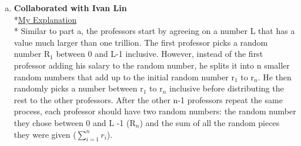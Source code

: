 \documentclass[12pt]{article}
\begin{document}
\begin{enumerate}[(a)]
\\*The second professor adds his salary to the number, mods it by L, then gives it to then next professor until all n professors have added their salary and modded the result. After the first professor receives the number from the nth professor, he subtracts his random number then mods the result by L to get the total salary of all the professors. Dividing by the amount of professors in the room n results in the average salary of all the professors in the room without any information leakage.
\vspace{0.5cm}
\\*\centerline{Total Salary $<$ 1 Trillion\hspace{0.75in} 1 Trillion $<$ L\hspace{0.75in} 0 $<$ Random Number, R0 $<$ L}
\smallskip
\\*\centerline{Professor One Adds Salary to R then Mods by L:} 
\\*\centerline{(S$_1$ + R$_0$) mod L}
\smallskip
\\*\centerline{Modding Ensures Uniform Distribution Resulting in Another Random Number:}
\\*\centerline{[(S$_1$+R$_0$) mod L] = R$_1$}
\smallskip
\\*\centerline{All n Professors Do the Same:}
\\*\centerline{[(S$_2$+R$_1$) mod L] = R$_2$}
\\*\centerline{[(S$_3$+R$_2$) mod L] = R$_3$}
\\*\centerline{. . .}
\\*\centerline{After All n Professors Added their Salary and Modded the Result:}
\\*\centerline{R$_n$ = (Total Salary of Professors + R$_0$) mod L}
\\*\centerline{Total Salary of Professors = (R$_n$ - R$_0$) mod L}
\smallskip
\\*\centerline{Divide the Total Salary by n to get the Average Value:}
\\*\centerline{Total Salary / n = Average Salary}
\medskip
\item\textbf{Collaborated with Ivan Lin}
\smallskip
\\*\uline{My Explanation}
\\* Similar to part a, the professors start by agreeing on a number L that has a value much larger than one trillion. The first professor picks a random number R$_1$ between 0 and L-1 inclusive. However, instead of the first professor adding his salary to the random number, he splits it into n smaller random numbers that add up to the initial random number r$_1$ to r$_n$. He then randomly picks a number between r$_1$ to r$_n$ inclusive before distributing the rest to the other professors. After the other n-1 professors repeat the same process, each professor should have two random numbers: the random number they chose between 0 and L -1 (R$_n$) and the sum of all the random pieces they were given ($\sum_{i=1}^{n} r_{i}$). 

\end{enumerate}
\end{document}
